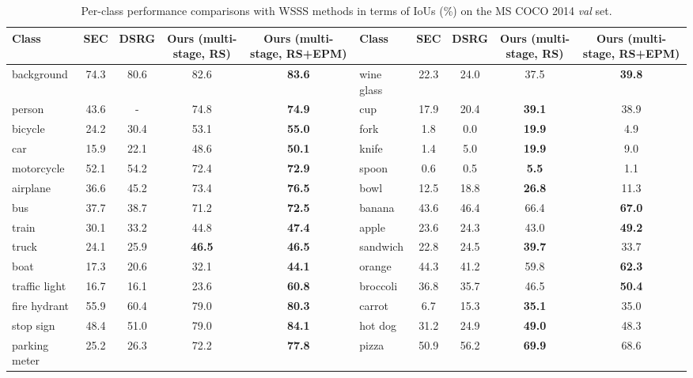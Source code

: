 \documentclass[11pt]{article}
\begin{document}
\begin{table*}[t]
  \centering
  \caption{
    Per-class performance comparisons with WSSS methods in terms of IoUs (\%) on the MS COCO 2014 \emph{val} set.
  }
  \hspace*{-6em}
  \begin{scriptsize}
  \begin{tabular}{
    p{} c c c c | p{} c c c c}
    \toprule
    Class & SEC & DSRG & Ours (multi-stage, RS) & Ours (multi-stage, RS+EPM) & Class &  SEC & DSRG & Ours (multi-stage, RS) & Ours (multi-stage, RS+EPM) \\
    \hline \hline
    background & 74.3 & 80.6 & 82.6 & \textbf{83.6} & wine glass & 22.3 & 24.0 & 37.5 & \textbf{39.8} \\
    person & 43.6 & - & 74.8 & \textbf{74.9} & cup & 17.9 & 20.4 & \textbf{39.1} & 38.9 \\
    bicycle & 24.2 & 30.4 & 53.1 & \textbf{55.0} & fork & 1.8 & 0.0 & \textbf{19.9} & 4.9 \\
    car & 15.9 & 22.1 & 48.6 & \textbf{50.1} & knife & 1.4 & 5.0 & \textbf{19.9} & 9.0 \\
    motorcycle & 52.1 & 54.2 & 72.4 & \textbf{72.9} & spoon & 0.6 & 0.5 & \textbf{5.5} & 1.1 \\
    airplane & 36.6 & 45.2 & 73.4 & \textbf{76.5} & bowl & 12.5 & 18.8 & \textbf{26.8} & 11.3 \\
    bus & 37.7 & 38.7 & 71.2 & \textbf{72.5} & banana & 43.6 & 46.4 & 66.4 & \textbf{67.0} \\
    train & 30.1 & 33.2 & 44.8 & \textbf{47.4} & apple & 23.6 & 24.3 & 43.0 & \textbf{49.2} \\
    truck & 24.1 & 25.9 & \textbf{46.5} & \textbf{46.5} & sandwich & 22.8 & 24.5 & \textbf{39.7} & 33.7 \\
    boat & 17.3 & 20.6 & 32.1 & \textbf{44.1} & orange & 44.3 & 41.2 & 59.8 & \textbf{62.3} \\
    traffic light & 16.7 & 16.1 & 23.6 & \textbf{60.8} & broccoli & 36.8 & 35.7 & 46.5 & \textbf{50.4} \\
    fire hydrant & 55.9 & 60.4 & 79.0 & \textbf{80.3} & carrot & 6.7 & 15.3 & \textbf{35.1} & 35.0 \\
    stop sign & 48.4 & 51.0 & 79.0 & \textbf{84.1} & hot dog & 31.2 & 24.9 & \textbf{49.0} & 48.3 \\
    parking meter & 25.2 & 26.3 & 72.2 & \textbf{77.8} & pizza & 50.9 & 56.2 & \textbf{69.9} & 68.6 \\

\end{tabular}
\end{scriptsize}
\end{table*}
\end{document}
